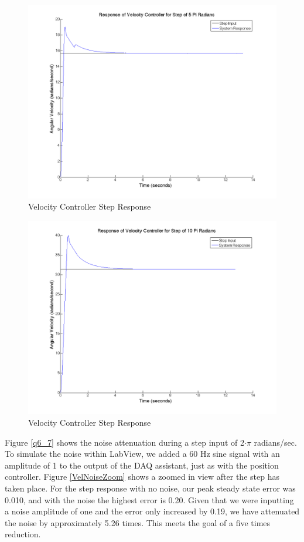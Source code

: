 \documentclass{article}
\theoremstyle{plain}
\theoremstyle{definition}
\theoremstyle{remark}
\begin{document}
\begin{figure}[htb]
\begin{center}
\includegraphics[width = 12cm]{velstep5Pi.png}
\caption{Velocity Controller Step Response}
\label{q6_5}
\end{center}
\end{figure}

\begin{figure}[htb]
\begin{center}
\includegraphics[width = 12cm]{velstep10Pi.png}
\caption{Velocity Controller Step Response}
\label{q6_6}
\end{center}
\end{figure}

Figure \ref{q6_7} shows the noise attenuation during a step input of 2$\cdot\pi$ radians/sec. To simulate the noise within LabView, we added a 60 Hz sine signal with an amplitude of 1 to the output of the DAQ assistant, just as with the position controller. Figure \ref{VelNoiseZoom} shows a zoomed in view after the step has taken place. For the step response with no noise, our peak steady state error was 0.010, and with the noise the highest error is 0.20. Given that we were inputting a noise amplitude of one and the error only increased by 0.19, we have attenuated the noise by approximately 5.26 times. This meets the goal of a five times reduction.\\
\end{document}
